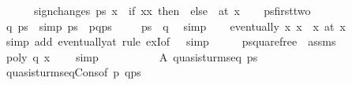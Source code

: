 \begin{isabellebody}
\ \ \ \ \ \ sign{\isacharunderscore}changes\ ps\ x\ {\isacharplus}\ {\isacharparenleft}if\ x{\isacharless}x\ then\ {}\ else\ {}{\isacharparenright}{\isacharparenright}\ {\isacharparenleft}at\ x\isanewline
%
\isadelimproof
%
\endisadelimproof
%
\isatagproof
{}\isamarkupfalse%
{\isacharminus}\isanewline
\ \ \isamarkupfalse%
\ ps{\isacharunderscore}first{\isacharunderscore}two\ \isamarkupfalse%
\ q\ ps{\isacharprime}\ \ {\isacharbrackleft}simp{\isacharbrackright}{\isacharcolon}\ {\isachardoublequoteopen}ps\ {\isacharequal}\ p{\isacharhash}q{\isacharhash}ps{\isacharprime}{\isachardoublequoteclose}\ \isacommand{{\isachardot}}\isamarkupfalse%
\isanewline
\ \ \isamarkupfalse%
\ {\isachardoublequoteopen}ps{\isacharbang}{}\ {\isacharequal}\ q{\isachardoublequoteclose}\ \isamarkupfalse%
\ simp\isanewline
\ \ \isamarkupfalse%
\ {\isachardoublequoteopen}eventually\ {\isacharparenleft}{\isasymlambda}x{\isachardot}\ x\ {\isasymnoteq}\ x\ {\isacharparenleft}at\ x\isanewline
\ \ \ \ \ \ \isamarkupfalse%
\ {\isacharparenleft}simp\ add{\isacharcolon}\ eventually{\isacharunderscore}at{\isacharcomma}\ rule\ exI{\isacharbrackleft}of\ {\isacharunderscore}\ {}{\isacharbrackright}{\isacharcomma}\ simp{\isacharparenright}\isanewline
\ \ \isamarkupfalse%
\ \isamarkupfalse%
\ p{\isacharunderscore}squarefree\ \ assms{\isacharparenleft}{}{\isacharparenright}\ \isamarkupfalse%
\ {\isachardoublequoteopen}poly\ q\ x\ {\isasymnoteq}\ {}{\isachardoublequoteclose}\ \isamarkupfalse%
\ simp\isanewline
\ \ \isacommand{{\isacharbraceleft}}\isamarkupfalse%
\isanewline
\ \ \ \ \ \ \isamarkupfalse%
\ A{\isacharcolon}\ {\isachardoublequoteopen}quasi{\isacharunderscore}sturm{\isacharunderscore}seq\ ps{\isachardoublequoteclose}\ \isacommand{{\isachardot}{\isachardot}}\isamarkupfalse%
\isanewline
\ \ \ \ \ \ \isamarkupfalse%
\ quasi{\isacharunderscore}sturm{\isacharunderscore}seq{\isacharunderscore}Cons{\isacharbrackleft}of\ p\ {\isachardoublequoteopen}q{\isacharhash}ps{\isacharprime}{\isachardoublequoteclose}{\isacharbrackright}\isanewline

\end{isabellebody}
